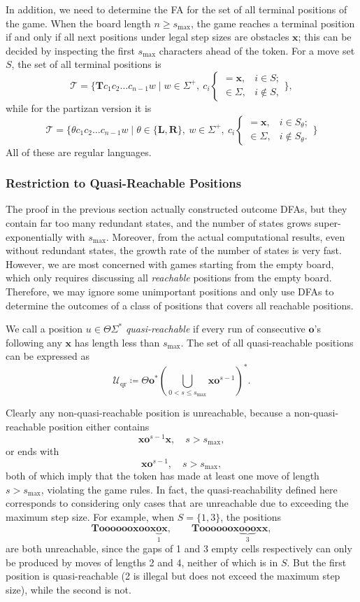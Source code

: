 \documentclass[11pt]{article}
\theoremstyle{definition}
\theoremstyle{plain}
\newcommand{\rmL}{\mathbf{L}}
\newcommand{\rmR}{\mathbf{R}}
\newcommand{\x}{\mathbf{x}}
\newcommand{\e}{\mathbf{o}}
\newcommand{\m}{\mathbf{T}}
\newcommand{\varU}{\mathcal{U}}
\newcommand{\varT}{\mathcal{T}}
\begin{document}
In addition, we need to determine the FA for the set of all terminal positions of the game.
When the board length $n\geq s_{\max}$, the game reaches a terminal position if and only if all next positions under legal step sizes are obstacles $\x$; this can be decided by inspecting the first $s_{\max}$ characters ahead of the token.
For a move set $S$, the set of all terminal positions is
\[
    \varT = \{\m c_1 c_2\ldots c_{n-1} w \mid w\in\varSigma^+,\ c_i
    \begin{cases}
        = \x, & i\in S; \\
        \in \varSigma, & i\notin S,
    \end{cases}\},
\]
while for the partizan version it is
\[
    \varT = \{\theta c_1 c_2\ldots c_{n-1} w \mid \theta\in\{\rmL, \rmR\},\ w\in\varSigma^+,\ c_i
    \begin{cases}
        = \x, & i\in S_{\theta}; \\
        \in \varSigma, & i\notin S_{\theta}.
    \end{cases}\}
\]
All of these are regular languages.

\subsubsection{Restriction to Quasi-Reachable Positions}

The proof in the previous section actually constructed outcome DFAs, but they contain far too many redundant states, and the number of states grows super-exponentially with $s_{\max}$.
Moreover, from the actual computational results, even without redundant states, the growth rate of the number of states is very fast.
However, we are most concerned with games starting from the empty board, which only requires discussing all \textit{reachable} positions from the empty board.
Therefore, we may ignore some unimportant positions and only use DFAs to determine the outcomes of a class of positions that covers all reachable positions.

We call a position $u\in\varTheta\varSigma^*$ \textit{quasi-reachable} if every run of consecutive $\e$'s following any $\x$ has length less than $s_{\max}$.
The set of all quasi-reachable positions can be expressed as
\[
    \varU_{\mathrm{qr}} \coloneq \varTheta \e^* \left( \bigcup_{0< s\leq s_{\max}} \x \e^{s-1} \right)^*.
\]

Clearly any non-quasi-reachable position is unreachable, because a non-quasi-reachable position either contains
\[
    \x \e^{s-1} \x,\quad s> s_{\max},
\]
or ends with
\[
    \x \e^{s-1},\quad s> s_{\max},
\]
both of which imply that the token has made at least one move of length $s>s_{\max}$, violating the game rules.
In fact, the quasi-reachability defined here corresponds to considering only cases that are unreachable due to exceeding the maximum step size.
For example, when $S=\{1, 3\}$, the positions
\[
    \m \e\e\e\e\e\e \x\e\e\x\underbrace{\e}_1\x,\qquad \m \e\e\e\e\e\e\x\underbrace{\e\e\e}_3 \x\x,
\]
are both unreachable, since the gaps of 1 and 3 empty cells respectively can only be produced by moves of lengths 2 and 4, neither of which is in $S$.
But the first position is quasi-reachable (2 is illegal but does not exceed the maximum step size), while the second is not.
\end{document}
